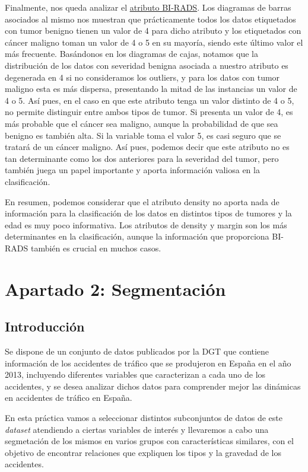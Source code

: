 \documentclass[a4paper,11pt]{book}
\begin{document}
Finalmente, nos queda analizar el \underline{atributo BI-RADS}. Los diagramas de barras asociados al mismo nos muestran que prácticamente todos los datos etiquetados con tumor benigno tienen un valor de 4 para dicho atributo y los etiquetados con cáncer maligno toman un valor de 4 o 5 en su mayoría, siendo este último valor el más frecuente. Basándonos en los diagramas de cajas, notamos que la distribución de los datos con severidad benigna asociada a nuestro atributo es degenerada en 4 si no consideramos los outliers, y para los datos con tumor maligno esta es más dispersa, presentando la mitad de las instancias un valor de 4 o 5. Así pues, en el caso en que este atributo tenga un valor distinto de 4 o 5, no permite distinguir entre ambos tipos de tumor. Si presenta un valor de 4, es más probable que el cáncer sea maligno, aunque la probabilidad de que sea benigno es también alta. Si la variable toma el valor 5, es casi seguro que se tratará de un cáncer maligno. Así pues, podemos decir que este atributo no es tan determinante como los dos anteriores para la severidad del tumor, pero también juega un papel importante y aporta información valiosa en la clasificación. 

En resumen, podemos considerar que el atributo density no aporta nada de información para la clasificación de los datos en distintos tipos de tumores y la edad es muy poco informativa. Los atributos de density y margin son los más determinantes en la clasificación, aunque la información que proporciona BI-RADS también es crucial en muchos casos. 
\chapter{Apartado 2: Segmentación}
\section{Introducción}

Se dispone de un conjunto de datos publicados por la DGT que contiene información de los accidentes de tráfico que se produjeron en España en el año 2013, incluyendo diferentes variables que caracterizan a cada uno de los accidentes, y se desea analizar dichos datos para comprender mejor las dinámicas en accidentes de tráfico en España.

En esta práctica vamos a seleccionar distintos subconjuntos de datos de este \textit{dataset} atendiendo a ciertas variables de interés  y llevaremos a cabo una segmetación  de los mismos en varios grupos con características similares, con el objetivo de encontrar relaciones que expliquen los tipos y la gravedad de los accidentes.
\end{document}

